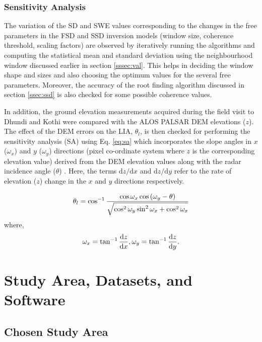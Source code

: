 \documentclass[review]{elsarticle}
\numberwithin{equation}{section}
\numberwithin{figure}{section}
\numberwithin{table}{section}
\begin{document}
\subsubsection{Sensitivity Analysis}
\label{sssec:sa}

The variation of the SD and SWE values corresponding to the changes in the free parameters in the FSD and SSD inversion models (window size, coherence threshold, scaling factors) are observed by iteratively running the algorithms and computing the statistical mean and standard deviation using the neighbourhood window discussed earlier in section \ref{sssec:val}. This helps in deciding the window shape and sizes and also choosing the optimum values for the several free parameters. Moreover, the accuracy of the root finding algorithm discussed in section \ref{ssec:ssd} is also checked for some possible coherence values.

In addition, the ground elevation measurements acquired during the field visit to Dhundi and Kothi were compared with the ALOS PALSAR DEM elevations ($z$). The effect of the DEM errors on the LIA, $\theta_l$, is then checked for performing the sensitivity analysis (SA) using Eq. \eqref{eq:sa} which incorporates the slope angles in $x$ ($\omega_x$) and $y$ ($\omega_y$) directions (pixel co-ordinate system where $z$ is the corresponding elevation value) derived from the DEM elevation values along with the radar incidence angle ($\theta$) \citep{Lee2000, Lee2009}. Here, the terms $\mathrm{d}z/\mathrm{d}x$ and $\mathrm{d}z/\mathrm{d}y$ refer to the rate of elevation ($z$) change in the $x$ and $y$ directions respectively.

\begin{equation}
    \centering
    \label{eq:sa}
    \theta_l = \cos^{-1}\frac{\cos\omega_x\cos\left(\omega_y - \theta\right)}{\sqrt{\cos^2\omega_y\sin^2\omega_x + \cos^2\omega_x}}
\end{equation}
where, 
\begin{equation*}
    \centering
    \omega_x = \tan^{-1}\frac{\mathrm{d}z}{\mathrm{d}x}, \omega_y = \tan^{-1}\frac{\mathrm{d}z}{\mathrm{d}y}.
\end{equation*}

\section{Study Area, Datasets, and Software}
\label{sec:study}

\subsection{Chosen Study Area}
\end{document}
